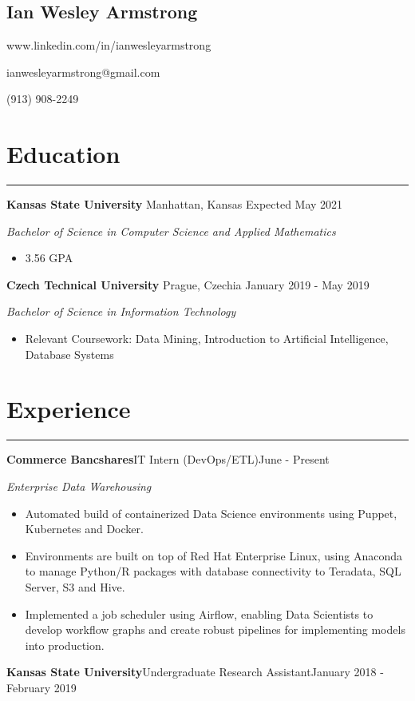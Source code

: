 \documentclass[11pt]{article}
\newcommand{\name}[1]{\begin{center}\section*{\huge #1}\end{center}}
\newcommand{\topinfo}[1]{\begin{center}\vspace{-0.2cm}#1\vspace{-0.2cm}\end{center}}
\newcommand{\resumesection}[1]{\vspace{-0.2cm}\section*{#1}\vspace{-0.2cm}\hrule\vspace{0.2cm}}
\begin{document}
\name{Ian Wesley Armstrong}
\topinfo{www.linkedin.com/in/ianwesleyarmstrong}
\topinfo{ianwesleyarmstrong@gmail.com}
\topinfo{(913) 908-2249}

\resumesection{Education}
\textbf{Kansas State University} \hfill Manhattan, Kansas \hfill Expected May 2021  

\textit{Bachelor of Science in Computer Science and Applied Mathematics}
\begin{itemize}
	\item 3.56 GPA
\end{itemize}

\textbf{Czech Technical University} \hfill Prague, Czechia \hfill January 2019 - May 2019 

\textit{Bachelor of Science in Information Technology }
\begin{itemize}
	\item Relevant Coursework: Data Mining, Introduction to Artificial Intelligence, Database Systems
\end{itemize}

\resumesection{Experience}
\textbf{Commerce Bancshares}\hfill{IT Intern (DevOps/ETL)}\hfill{June - Present} 

\textit{Enterprise Data Warehousing}
\begin{itemize}
	\item Automated build of containerized Data Science environments using Puppet, Kubernetes and Docker.
	\item Environments are built on top of Red Hat Enterprise Linux, using Anaconda to manage Python/R packages with database connectivity to Teradata, SQL Server, S3 and Hive.
	\item Implemented a job scheduler using Airflow, enabling Data Scientists to develop workflow graphs and create robust pipelines for implementing models into production.
\end{itemize}

\textbf{Kansas State University}\hfill{Undergraduate Research Assistant}\hfill{January 2018 - February 2019} 
\end{document}
